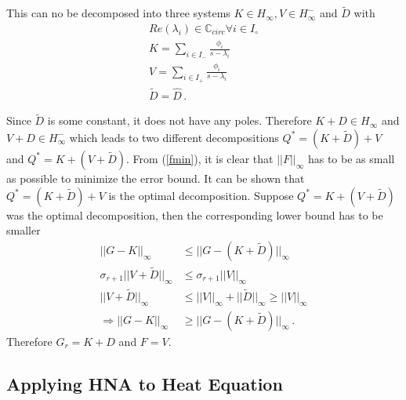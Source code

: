 This can no be decomposed into three systems \(K \in H_\infty, V \in H_{\infty}^-\) and \(\tilde{D}\) with
\begin{gather}
Re(\lambda_i) \in \mathbb{C}_{circ} \forall i \in I_{\circ} \\
K = \sum_{i \in I_-} \frac{\phi_i}{s-\lambda_i} \\
V = \sum_{i \in I_+} \frac{\phi_i}{s-\lambda_i} \\
\tilde{D} = \hat{D} \,.
\end{gather}

Since \(\tilde{D}\) is some constant, it does not have any poles.
Therefore \(K + D \in H_\infty\) and \(V + D \in H_{\infty}^-\) which leads to two different decompositions \(Q^{*} = (K + \tilde{D}) + V \) and \(Q^{*} = K + (V + \tilde{D})\).
From (\ref{fmin}), it is clear that \(||F||_{\infty}\) has to be as small as possible to minimize the error bound.
It can be shown that \(Q^{*} = (K + \tilde{D}) + V \) is the optimal decomposition.
Suppose \(Q^{*} = K + (V + \tilde{D})\) was the optimal decomposition, then the corresponding lower bound has to be smaller
\begin{align}
||G-K||_{\infty} &\leq ||G-(K+\tilde{D})||_{\infty} \\
\sigma_{r+1}||V + \tilde{D}||_{\infty} &\leq \sigma_{r+1}||V||_{\infty} \\
||V + \tilde{D}||_{\infty} &\leq ||V||_{\infty} + ||\tilde{D}||_{\infty} \geq ||V||_{\infty} \\
\Rightarrow ||G-K||_{\infty} &\geq ||G-(K+\tilde{D})||_{\infty} \,.
\end{align}
Therefore \(G_r = K + D\) and \(F = V\).

\subsection{Applying HNA to Heat Equation}

